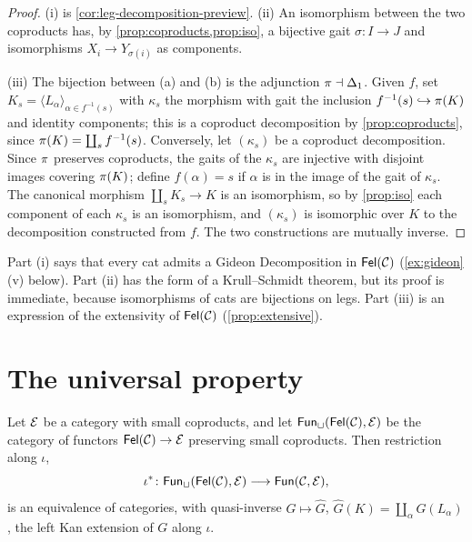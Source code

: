 \begin{proof}
(i) is \cref{cor:leg-decomposition-preview}. (ii) An isomorphism between the two
coproducts has, by \cref{prop:coproducts,prop:iso}, a bijective gait
$\sigma\colon I\to J$ and isomorphisms $X_i\to Y_{\sigma(i)}$ as components.

(iii) The bijection between (a) and (b) is the adjunction $\pi\dashv\Delta_1$.
Given $f$, set $K_s=\langle L_\alpha\rangle_{\alpha\in f^{-1}(s)}$ with $\kappa_s$
the morphism with gait the inclusion $f^{-1}(s)\hookrightarrow\pi(K)$ and
identity components; this is a coproduct decomposition by
\cref{prop:coproducts}, since $\pi(K)=\coprod_sf^{-1}(s)$. Conversely, let
$(\kappa_s)$ be a coproduct decomposition. Since $\pi$ preserves coproducts,
the gaits of the $\kappa_s$ are injective with disjoint images covering
$\pi(K)$; define $f(\alpha)=s$ if $\alpha$ is in the image of the gait of
$\kappa_s$. The canonical morphism $\coprod_sK_s\to K$ is an isomorphism, so by
\cref{prop:iso} each component of each $\kappa_s$ is an isomorphism, and
$(\kappa_s)$ is isomorphic over $K$ to the decomposition constructed from $f$.
The two constructions are mutually inverse.
\end{proof}

\begin{remark}\label{rem:leg-decomposition-honest}
Part (i) says that every cat admits a Gideon Decomposition in $\mathsf{Fel}(\mathcal{C})$
(\cref{ex:gideon}(v) below). Part (ii) has the form of a Krull--Schmidt theorem, but its proof is immediate,
because isomorphisms of cats are bijections on legs. Part (iii) is an expression
of the extensivity of $\mathsf{Fel}(\mathcal{C})$ (\cref{prop:extensive}).
\end{remark}

\section{The universal property}\label{sec:universal-property}

\begin{theorem}\label{thm:universal-property}
Let $\mathcal{E}$ be a category with small coproducts, and let $\mathsf{Fun}_\sqcup(\mathsf{Fel}(\mathcal{C}),\mathcal{E})$
be the category of functors $\mathsf{Fel}(\mathcal{C})\to\mathcal{E}$ preserving small coproducts. Then
restriction along $\iota$,
\[
\iota^*\colon\mathsf{Fun}_\sqcup(\mathsf{Fel}(\mathcal{C}),\mathcal{E})\longrightarrow\mathsf{Fun}(\mathcal{C},\mathcal{E}),
\]
is an equivalence of categories, with quasi-inverse $G\mapsto\widehat G$,
$\widehat G(K)=\coprod_{\alpha}G(L_\alpha)$, the left Kan extension of $G$ along $\iota$.
\end{theorem}

